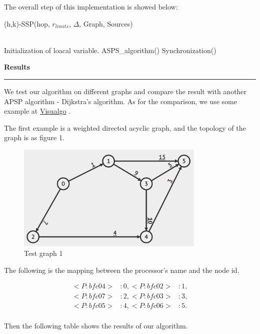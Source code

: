 \documentclass[11pt]{article}  %
\begin{document}
\begin{enumerate}
    The overall step of this implementation is showed below:
        \begin{algorithm}[htb] 
        \caption{(h,k)-SSP(hop, $r_{limits}$, $\Delta$, Graph, Sources)} 
        \label{alg:Framwork} 
        \begin{algorithmic}[1] %
        \REQUIRE ~~\\ %
        \STATE Initialization of loacal variable.
        \STATE ASPS\_algorithm()
        \STATE Synchronization()
        \ENDWHILE
        \end{algorithmic}
        \end{algorithm}
   
    
\end{enumerate}

{\bf Results}

\rule{6in}{.1pt}       %

We test our algorithm on different graphs and compare the result with another APSP algorithm - Dijkstra's algorithm. As for the comparison, we use some example at \href{https://visualgo.net/en/sssp}{Visualgo} .\par

The first example is a weighted directed acyclic graph, and the topology of the graph is as figure 1.

\begin{figure}[ht]
\centering
\includegraphics[width=9cm]{dag/0.png}
\caption{Test graph 1}
\end{figure}\par

The following is the mapping between the processor's name and the node id.\par

\begin{equation}\nonumber
\begin{aligned}
<P:bfc04>&: 0, 
<P:bfc02>&: 1, \\
<P:bfc07>&: 2, 
<P:bfc03>&: 3, \\
<P:bfc05>&: 4, 
<P:bfc06>&: 5. \\
\end{aligned}
\end{equation}\par
Then the following table shows the results of our algorithm.\par 
\end{document}
